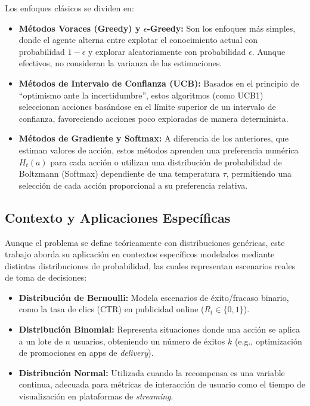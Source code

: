 Los enfoques clásicos se dividen en:
\begin{itemize}
    \item \textbf{Métodos Voraces (Greedy) y $\epsilon$-Greedy:} Son los enfoques más simples, 
    donde el agente alterna entre explotar el conocimiento actual con probabilidad $1-\epsilon$ 
    y explorar aleatoriamente con probabilidad $\epsilon$. Aunque efectivos, no consideran 
    la varianza de las estimaciones.
    \item \textbf{Métodos de Intervalo de Confianza (UCB):} Basados en el principio de 
    ``optimismo ante la incertidumbre'', estos algoritmos (como UCB1) seleccionan 
    acciones basándose en el límite superior de un intervalo de confianza, favoreciendo
     acciones poco exploradas de manera determinista.
    \item \textbf{Métodos de Gradiente y Softmax:} A diferencia de los anteriores, 
    que estiman valores de acción, 
    estos métodos aprenden una preferencia numérica $H_t(a)$ para cada acción o 
    utilizan una distribución de probabilidad de Boltzmann (Softmax) dependiente de 
    una temperatura $\tau$, permitiendo una selección de cada acción proporcional a su preferencia relativa.
\end{itemize}

\subsection{Contexto y Aplicaciones Específicas}
Aunque el problema se define teóricamente con distribuciones genéricas, este trabajo aborda su aplicación en contextos específicos modelados mediante distintas distribuciones de probabilidad, las cuales representan escenarios reales de toma de decisiones:
\begin{itemize}
    \item \textbf{Distribución de Bernoulli:} Modela escenarios de éxito/fracaso binario, como la tasa de clics (CTR) en publicidad online ($R_t \in \{0, 1\}$).
    \item \textbf{Distribución Binomial:} Representa situaciones donde una acción se aplica a un lote de $n$ usuarios, obteniendo un número de éxitos $k$ (e.g., optimización de promociones en apps de \textit{delivery}).
    \item \textbf{Distribución Normal:} Utilizada cuando la recompensa es una variable continua, adecuada para métricas de interacción de usuario como el tiempo de visualización en plataformas de \textit{streaming}.
\end{itemize}

